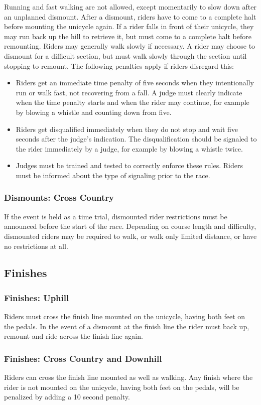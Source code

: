 Running and fast walking are not allowed, except momentarily to slow down after an unplanned dismount.
After a dismount, riders have to come to a complete halt before mounting the unicycle again.
If a rider falls in front of their unicycle, they may run back up the hill to retrieve it, but must come to a complete halt before remounting.
Riders may generally walk slowly if necessary.
A rider may choose to dismount for a difficult section, but must walk slowly through the section until stopping to remount.
The following penalties apply if riders disregard this:
\begin{itemize}
\item Riders get an immediate time penalty of five seconds when they intentionally run or walk fast, not recovering from a fall.
A judge must clearly indicate when the time penalty starts and when the rider may continue, for example by blowing a whistle and counting down from five.
\item Riders get disqualified immediately when they do not stop and wait five seconds after the judge's indication.
The disqualification should be signaled to the rider immediately by a judge, for example by blowing a whistle twice.
\item Judges must be trained and tested to correctly enforce these rules.
Riders must be informed about the type of signaling prior to the race.
\end{itemize}

\subsubsection{Dismounts: Cross Country}

If the event is held as a time trial, dismounted rider restrictions must be announced before the start of the race.
Depending on course length and difficulty, dismounted riders may be required to walk, or walk only limited distance, or have no restrictions at all.

\subsection{Finishes}

\subsubsection{Finishes: Uphill}
Riders must cross the finish line mounted on the unicycle, having both feet on the pedals.
In the event of a dismount at the finish line the rider must back up, remount and ride across the finish line again.
\subsubsection{Finishes: Cross Country and Downhill}
Riders can cross the finish line mounted as well as walking. %
Any finish where the rider is not mounted on the unicycle, having both feet on the pedals, will be penalized by adding a 10 second penalty.
